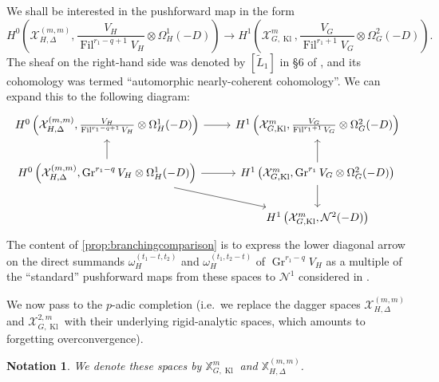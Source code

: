 \documentclass[cjm]{ipart}
\theoremstyle{plain}
\newtheorem{notation}[theorem]{Notation}
\theoremstyle{remark}
\DeclareMathOperator{\Fil}{Fil}
\DeclareMathOperator{\Gr}{Gr}
\DeclareMathOperator{\Kl}{Kl}
\newcommand{\cN}{\mathcal{N}}
\newcommand{\cX}{\mathcal{X}}
\numberwithin{equation}{subsection}
\begin{document}
   We shall be interested in the pushforward map in the form
   \[
    H^0\left(\cX_{H, \Delta}^{(m,m)}, \frac{V_H}{\Fil^{r_1 - q + 1} V_H} \otimes \Omega^1_H(-D)\right)
   \to H^1\left(\cX_{G, \Kl}^m, \frac{V_G}{\Fil^{r_1 + 1} V_G} \otimes \Omega^2_G(-D)\right).
   \]
   The sheaf on the right-hand side was denoted by $[\tilde{L}_1]$ in \S 6 of \cite{LPSZ1}, and its cohomology was termed ``automorphic nearly-coherent cohomology''. We can expand this to the following diagram:
   \[
    \begin{tikzcd}
     H^0\left(\cX_{H, \Delta}^{(m,m)}, \frac{V_H}{\Fil^{r_1 - q + 1} V_H} \otimes \Omega^1_H(-D)\right)
     \rar & %
     H^1\left(\cX_{G, \Kl}^m, \frac{V_G}{\Fil^{r_1 + 1} V_G} \otimes \Omega^2_G(-D)\right)
     \\
     H^0\left(\cX_{H, \Delta}^{(m,m)}, \Gr^{r_1-q} V_H \otimes \Omega^1_H(-D)\right)
     \rar \uar \arrow{rd} &
     H^1\left(\cX_{G, \Kl}^m, \Gr^{r_1} V_G \otimes \Omega^2_G(-D)\right)
     \uar \dar \\
     &
     H^1\left(\cX_{G, \Kl}^m, \cN^2(-D)\right)
    \end{tikzcd}
   \]
   The content of \cref{prop:branchingcomparison} is to express the lower diagonal arrow on the direct summands $\omega_H^{(t_1 - t, t_2)}$ and $\omega_H^{(t_1, t_2 - t)}$ of $\Gr^{r_1 - q} V_H$ as a multiple of the ``standard'' pushforward maps from these spaces to $\cN^1$ considered in \cite[\S 4.6]{LPSZ1}.

   We now pass to the $p$-adic completion (i.e.~we replace the dagger spaces $\cX_{H, \Delta}^{(m,m)}$ and $\cX_{G, \Kl}^{2,m}$ with their underlying rigid-analytic spaces, which amounts to forgetting overconvergence).

   \begin{notation}
    We denote these spaces by $\mathbb{X}_{G, \Kl}^m$ and $\mathbb{X}_{H, \Delta}^{(m,m)}$.
   \end{notation}
\end{document}
